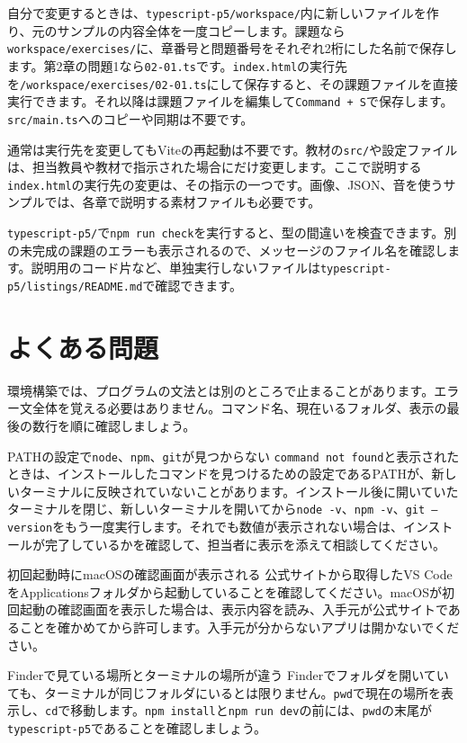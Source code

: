 自分で変更するときは、\texttt{typescript-p5/workspace/}内に新しいファイルを作り、元のサンプルの内容全体を一度コピーします。課題なら\texttt{workspace/exercises/}に、章番号と問題番号をそれぞれ2桁にした名前で保存します。第2章の問題1なら\texttt{02-01.ts}です。\texttt{index.html}の実行先を\texttt{/workspace/exercises/02-01.ts}にして保存すると、その課題ファイルを直接実行できます。それ以降は課題ファイルを編集して\texttt{Command + S}で保存します。\texttt{src/main.ts}へのコピーや同期は不要です。

通常は実行先を変更してもViteの再起動は不要です。教材の\texttt{src/}や設定ファイルは、担当教員や教材で指示された場合にだけ変更します。ここで説明する\texttt{index.html}の実行先の変更は、その指示の一つです。画像、JSON、音を使うサンプルでは、各章で説明する素材ファイルも必要です。

\texttt{typescript-p5/}で\texttt{npm run check}を実行すると、型の間違いを検査できます。別の未完成の課題のエラーも表示されるので、メッセージのファイル名を確認します。説明用のコード片など、単独実行しないファイルは\texttt{typescript-p5/listings/README.md}で確認できます。

\section{よくある問題}

環境構築では、プログラムの文法とは別のところで止まることがあります。エラー文全体を覚える必要はありません。コマンド名、現在いるフォルダ、表示の最後の数行を順に確認しましょう。

\begin{mistakebox}{PATHの設定で\texttt{node}、\texttt{npm}、\texttt{git}が見つからない}
\texttt{command not found}と表示されたときは、インストールしたコマンドを見つけるための設定であるPATHが、新しいターミナルに反映されていないことがあります。インストール後に開いていたターミナルを閉じ、新しいターミナルを開いてから\texttt{node -v}、\texttt{npm -v}、\texttt{git --version}をもう一度実行します。それでも数値が表示されない場合は、インストールが完了しているかを確認して、担当者に表示を添えて相談してください。
\end{mistakebox}

\begin{mistakebox}{初回起動時にmacOSの確認画面が表示される}
公式サイトから取得したVS CodeをApplicationsフォルダから起動していることを確認してください。macOSが初回起動の確認画面を表示した場合は、表示内容を読み、入手元が公式サイトであることを確かめてから許可します。入手元が分からないアプリは開かないでください。
\end{mistakebox}

\begin{mistakebox}{Finderで見ている場所とターミナルの場所が違う}
Finderでフォルダを開いていても、ターミナルが同じフォルダにいるとは限りません。\texttt{pwd}で現在の場所を表示し、\texttt{cd}で移動します。\texttt{npm install}と\texttt{npm run dev}の前には、\texttt{pwd}の末尾が\texttt{typescript-p5}であることを確認しましょう。
\end{mistakebox}
